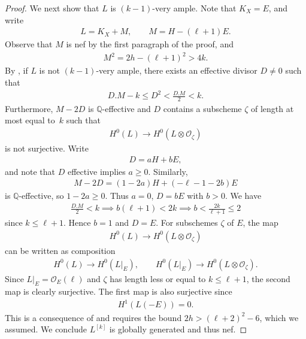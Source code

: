 \documentclass[pdftex]{sigma}
\numberwithin{equation}{section}
\begin{document}
\begin{proof}
We next show that $L$ is $(k-1)$-very ample. Note that $K_X=E$, and write
\begin{gather*}
L=K_X+M, \qquad M=H-(\ell+1)E.
\end{gather*}
Observe that $M$ is nef by the first paragraph of the proof, and
\begin{gather*}
M^2=2h-(\ell+1)^2>4k.
\end{gather*}
By \cite[Theorem 2.1]{BS}, if $L$ is not $(k-1)$-very ample, there exists an effective divisor $D\neq 0$ such that
\begin{gather*}
D.M-k\leq D^2<\frac{D.M}{2}<k.
\end{gather*}
Furthermore, $M-2D$ is $\mathbb Q$-effective and $D$ contains a subscheme $\zeta$ of length at most
equal to~$k$ such that
\begin{gather*}
H^0(L)\to H^0(L\otimes \mathcal O_\zeta)
\end{gather*}
is not surjective. Write \begin{gather*}D=aH+bE,
\end{gather*}
and note that $D$ effective implies $a\geq 0$. Similarly,
\begin{gather*}
M-2D=(1-2a)H+(-\ell-1-2b)E
\end{gather*}
is $\mathbb Q$-effective, so $1-2a\geq 0$. Thus $a=0$, $D=bE$ with $b > 0$. We have
\begin{gather*}
\frac{D.M}{2}<k\implies b(\ell+1)<2k\implies b<\frac{2k}{\ell+1}\leq 2
\end{gather*}
since $k\leq \ell+1$. Hence $b=1$ and $D=E$. For subschemes $\zeta$ of $E$, the map
\begin{gather*}
H^0(L)\to H^0(L\otimes \mathcal O_\zeta)
\end{gather*}
can be written as composition
\begin{gather*}
H^0(L)\to H^0(L|_{E}), \qquad H^0(L|_E)\to H^0(L\otimes \mathcal O_{\zeta}).
\end{gather*}
Since $L|_{E}=\mathcal O_E(\ell)$ and $\zeta$ has length less or equal to $k\leq \ell+1$, the second map is clearly surjective. The first map is also surjective since
\begin{gather*}
H^1(L(-E))=0.
\end{gather*}
This is a consequence of \cite[Proposition 4.1]{V} and requires the bound $2h>(\ell+2)^2-6$, which we assumed. We conclude $L^{[k]}$ is globally generated and thus nef.


\end{proof}
\end{document}
